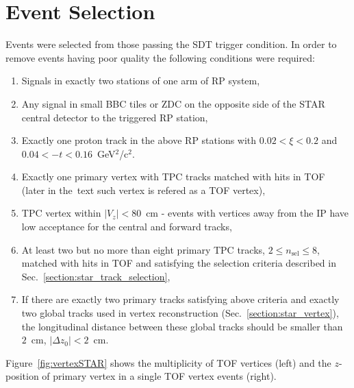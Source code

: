 \section{Event Selection}\label{section:star_event_selection}
Events were selected from those passing the SDT trigger condition. In order to remove events having poor quality the following conditions were required:
\begin{enumerate}
	\item Signals in exactly two stations of one arm of \ac{RP} system,
	\item Any signal in small BBC tiles or ZDC on the opposite side of the STAR central detector to the triggered RP station,
	\item Exactly one proton track in the above RP stations with $0.02 < \xi < 0.2$ and $0.04 < -t < 0.16$~GeV$^{2}$/c$^{2}$. 
	\item Exactly one primary vertex with TPC tracks matched with hits in TOF (later in the~text such vertex  is refered as a TOF vertex),
	\item TPC vertex  within $|V_z|<80$~cm - events with vertices away from the IP have low acceptance for the central and forward tracks,
	\item At least two but no more than eight primary TPC tracks, $2\leq n_{\textrm{sel}}\leq 8$, matched with hits in TOF and satisfying the selection criteria described in Sec.~\ref{section:star_track_selection},
	\item If there are exactly two primary tracks satisfying above criteria and exactly two global tracks used in vertex reconstruction (Sec.~\ref{section:star_vertex}), the longitudinal distance between these global tracks should be smaller than $2$~cm, $|\Delta z_0|<2$~cm.
\end{enumerate}
Figure~\ref{fig:vertexSTAR} shows the multiplicity of TOF vertices (left) and the $z$-position of primary vertex in a single TOF vertex events (right). 

